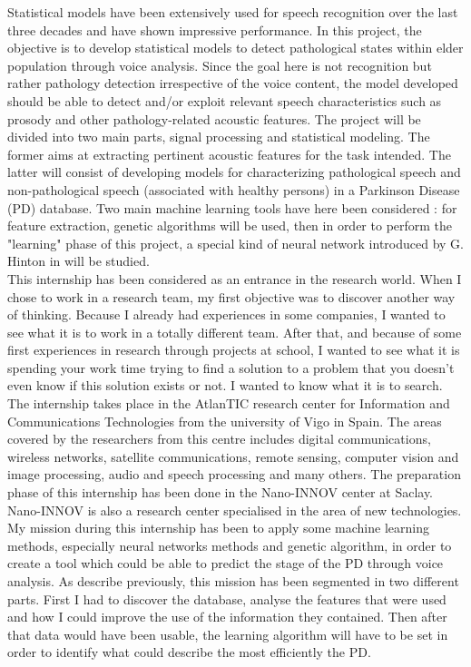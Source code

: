 \documentclass{report}
\begin{document}
	Statistical models have been extensively used for speech recognition over the last three decades and have shown impressive performance. In this project, the objective is to develop statistical models to detect pathological states within elder population through voice analysis. Since the goal here is not recognition but rather pathology detection irrespective of the voice content, the model developed should be able to detect and/or exploit relevant speech characteristics such as prosody and other pathology-related acoustic features. The project will be divided into two main parts, signal processing and statistical modeling. The former aims at extracting pertinent acoustic features for the task intended. The latter will consist of developing models for characterizing pathological speech and non-pathological speech (associated with healthy persons) in a Parkinson Disease (PD) database. Two main machine learning tools have here been considered : for feature extraction, genetic algorithms will be used, then in order to perform the "learning" phase of this project, a special kind of neural network introduced by G. Hinton in \cite{hinton2006fast} will be studied.\\
	
	This internship has been considered as an entrance in the research world. When I chose to work in a research team, my first objective was to discover another way of thinking. Because I already had experiences in some companies, I wanted to see what it is to work in a totally different team. After that, and because of some first experiences in research through projects at school, I wanted to see what it is spending your work time trying to find a solution to a problem that you doesn't even know if this solution exists or not. I wanted to know what it is to search.\\
	
	The internship takes place in the AtlanTIC research center for Information and Communications Technologies from the university of Vigo in Spain. The areas covered by the researchers from this centre includes digital communications, wireless networks, satellite communications, remote sensing, computer vision and image processing, audio and speech processing and many others. The preparation phase of this internship has been done in the Nano-INNOV center at Saclay. Nano-INNOV is also a research center specialised in the area of new technologies.\\
	
	My mission during this internship has been to apply some machine learning methods, especially neural networks methods and genetic algorithm, in order to create a tool which could be able to predict the stage of the PD through voice analysis. As describe previously, this mission has been segmented in two different parts. First I had to discover the database, analyse the features that were used and how I could improve the use of the information they contained. Then after that data would have been usable, the learning algorithm will have to be set in order to identify what could describe the most efficiently the PD.\\
	
\end{document}
